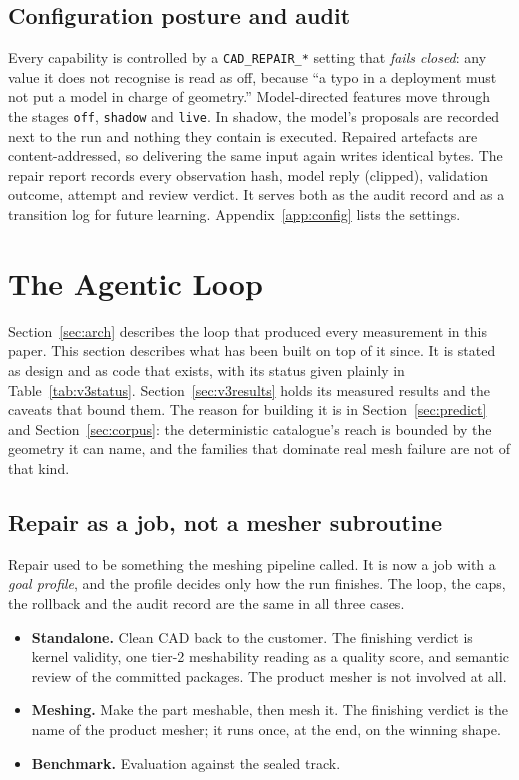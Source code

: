 \documentclass[11pt,onecolumn]{article}
\newcommand{\code}[1]{\texttt{\small #1}}
\begin{document}
\subsection{Configuration posture and audit}
Every capability is controlled by a \code{CAD\_REPAIR\_*} setting that \emph{fails closed}: any
value it does not recognise is read as off, because ``a typo in a deployment must not put a model in
charge of geometry.'' Model-directed features move through the stages \code{off}, \code{shadow} and
\code{live}. In shadow, the model's proposals are recorded next to the run and nothing they contain
is executed. Repaired artefacts are content-addressed, so delivering the same input again writes
identical bytes. The repair report records every observation hash, model reply (clipped), validation
outcome, attempt and review verdict. It serves both as the audit record and as a transition log for
future learning. Appendix~\ref{app:config} lists the settings.

\section{The Agentic Loop}\label{sec:v3}

Section~\ref{sec:arch} describes the loop that produced every measurement in this paper. This
section describes what has been built on top of it since. It is stated as design and as code
that exists, with its status given plainly in Table~\ref{tab:v3status}. Section~\ref{sec:v3results}
holds its measured results and the caveats that bound them. The reason for
building it is in Section~\ref{sec:predict} and Section~\ref{sec:corpus}: the deterministic
catalogue's reach is bounded by the geometry it can name, and the families that dominate real
mesh failure are not of that kind.

\subsection{Repair as a job, not a mesher subroutine}\label{sec:goals}

Repair used to be something the meshing pipeline called. It is now a job with a \emph{goal
profile}, and the profile decides only how the run finishes. The loop, the caps, the rollback and
the audit record are the same in all three cases.

\begin{itemize}
  \item \textbf{Standalone.} Clean CAD back to the customer. The finishing verdict is kernel
        validity, one tier-2 meshability reading as a quality score, and semantic review of the
        committed packages. The product mesher is not involved at all.
  \item \textbf{Meshing.} Make the part meshable, then mesh it. The finishing verdict is the name of
        the product mesher; it runs once, at the end, on the winning shape.
  \item \textbf{Benchmark.} Evaluation against the sealed track.
\end{itemize}
\end{document}

